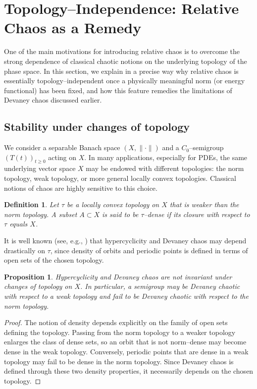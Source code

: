 \documentclass[12pt]{article}
\newtheorem{proposition}[theorem]{Proposition}
\newtheorem{definition}[theorem]{Definition}
\begin{document}
\section{Topology--Independence: Relative Chaos as a Remedy}\label{TIRCR}

One of the main motivations for introducing relative chaos is to overcome the strong dependence of classical chaotic notions on the underlying topology of the phase space. In this section, we explain in a precise way why relative chaos is essentially topology--independent once a physically meaningful norm (or energy functional) has been fixed, and how this feature remedies the limitations
of Devaney chaos discussed earlier.

\subsection{Stability under changes of topology}

We consider a separable Banach space $(X,\|\cdot\|)$ and a $C_0$--semigroup $(T(t))_{t\ge 0}$ acting on $X$. In many applications, especially for PDEs, the same underlying vector space $X$ may be endowed with different topologies: the norm topology, weak topology, or more general locally convex topologies. Classical notions of chaos are highly sensitive to this choice.

\begin{definition}
Let $\tau$ be a locally convex topology on $X$ that is weaker than the norm topology. A subset $A\subset X$ is said to be $\tau$--dense if its closure with respect to $\tau$ equals $X$.
\end{definition}

It is well known (see, e.g., \cite{BayartMatheron2009,GrosseErdmannPeris2011}) that
hypercyclicity and Devaney chaos may depend drastically on $\tau$, since density of orbits and periodic points is defined in terms of open sets of the chosen topology.

\begin{proposition}\label{prop:topology_sensitivity}
Hypercyclicity and Devaney chaos are not invariant under changes of topology on $X$. In particular, a semigroup may be Devaney chaotic with respect to a weak topology and fail to be Devaney chaotic with respect to the norm topology.
\end{proposition}

\begin{proof}
The notion of density depends explicitly on the family of open sets defining the topology. Passing from the norm topology to a weaker topology enlarges the class of dense sets, so an orbit that is not norm--dense may become dense in the weak topology. Conversely, periodic points that are dense in a weak topology may fail
to be dense in the norm topology. Since Devaney chaos is defined through these two density properties, it necessarily depends on the chosen topology.
\end{proof}
\end{document}
